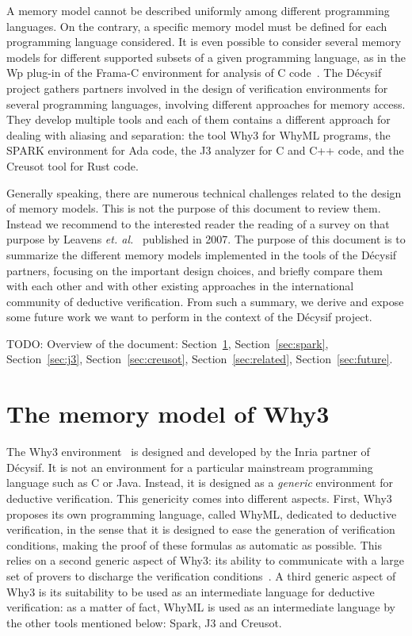 \documentclass[a4paper,11pt]{article}
\begin{document}
A memory model cannot be described uniformly among different programming
languages. On the contrary, a specific memory model must be defined for each
programming language considered. It is even possible to consider several memory
models for different supported subsets of a given programming language, as in
the Wp plug-in of the Frama-C environment for analysis of C
code~\cite{blanchard2024wp}.
%
The Décysif project gathers partners involved in the design of
verification environments for several programming languages, involving
different approaches for memory access. They develop multiple tools and each of them
contains a different approach for dealing with aliasing and separation: the tool
Why3 for WhyML programs, the SPARK environment for Ada code, the J3
analyzer for C and C++ code, and the Creusot tool for Rust code.

Generally speaking, there are numerous technical challenges related to the
design of memory models. This is not the purpose of this document to review
them. Instead we recommend to the interested reader the reading of a survey on
that purpose by Leavens \emph{et. al.}~\cite{leavens07} published in 2007.  The
purpose of this document is to summarize the different memory models
implemented in the tools of the Décysif partners, focusing on the important design
choices, and briefly compare them with each other and with other existing
approaches in the international community of deductive verification. From such a
summary, we derive and expose some future work we want to perform in the context
of the Décysif project.

TODO: Overview of the document: Section~\ref{sec:why3}, Section~\ref{sec:spark},
Section~\ref{sec:j3}, Section~\ref{sec:creusot}, Section~\ref{sec:related},
Section~\ref{sec:future}.

\section{The memory model of Why3}
\label{sec:why3}

The Why3
environment~\cite{filliatre13esop,bobot14sttt,blazy19fmtea,paskevich20isola} is
designed and developed by the Inria partner of Décysif. It is not an environment
for a particular mainstream programming language such as C or Java. Instead, it
is designed as a \emph{generic} environment for deductive verification. This
genericity comes into different aspects. First, Why3 proposes its own
programming language, called WhyML, dedicated to deductive verification, in the
sense that it is designed to ease the generation of verification conditions,
making the proof of these formulas as automatic as possible. This relies on a
second generic aspect of Why3: its ability to communicate with a large set of
provers to discharge the verification conditions~\cite{boogie11why3}. A third
generic aspect of Why3 is its suitability to be used as an intermediate language
for deductive verification: as a matter of fact, WhyML is used as an
intermediate language by the other tools mentioned below: Spark, J3 and Creusot.
\end{document}
